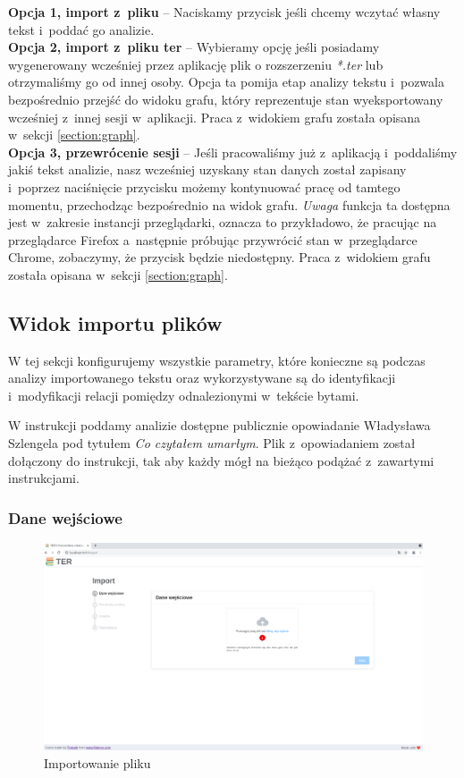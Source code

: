 \documentclass[12pt, a4paper]{article}
\begin{document}
\textbf{Opcja 1, import z~pliku} -- Naciskamy przycisk jeśli chcemy wczytać własny tekst i~poddać go analizie.\\

\noindent\textbf{Opcja 2, import z~pliku ter} -- Wybieramy opcję jeśli posiadamy wygenerowany wcześniej przez aplikację plik o rozszerzeniu \textit{*.ter} lub otrzymaliśmy go od innej osoby. Opcja ta pomija etap analizy tekstu i~pozwala bezpośrednio przejść do widoku grafu, który reprezentuje stan wyeksportowany wcześniej z~innej sesji w~aplikacji. Praca z~widokiem grafu została opisana w~sekcji \ref{section:graph}.\\

\noindent\textbf{Opcja 3, przewrócenie sesji} -- Jeśli pracowaliśmy już z~aplikacją i~poddaliśmy jakiś tekst analizie, nasz wcześniej uzyskany stan danych został zapisany i~poprzez naciśnięcie przycisku możemy kontynuować pracę od tamtego momentu, przechodząc bezpośrednio na widok grafu. \textit{Uwaga} funkcja ta dostępna jest w~zakresie instancji przeglądarki, oznacza to przykładowo, że pracując na przeglądarce Firefox a~następnie próbując przywrócić stan w~przeglądarce Chrome, zobaczymy, że przycisk będzie niedostępny. Praca z~widokiem grafu została opisana w~sekcji \ref{section:graph}.

\pagebreak

\subsection{Widok importu plików}

W tej sekcji konfigurujemy wszystkie parametry, które konieczne są podczas analizy importowanego tekstu oraz wykorzystywane są do identyfikacji i~modyfikacji relacji pomiędzy odnalezionymi w~tekście bytami.

W instrukcji poddamy analizie dostępne publicznie opowiadanie Władysława Szlengela pod tytułem \textit{Co czytałem umarłym}. Plik z~opowiadaniem został dołączony do instrukcji, tak aby każdy mógł na bieżąco podążać z~zawartymi instrukcjami.

\subsubsection{Dane wejściowe}

\begin{figure}[H]
  \centering
  \includegraphics[width=\linewidth]{images/import-before-file.png}
  \caption{Importowanie pliku}
\end{figure}
\end{document}
